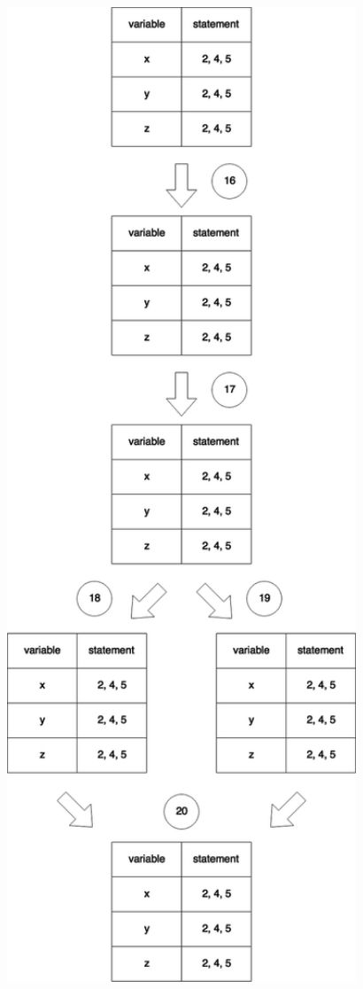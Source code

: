 \documentclass[12pt]{article}
\begin{document}
{{{{{{{{{{{{{{\begin{center}
\noindent
\begin{minipage}{15em}
\begin{flushleft}
\noindent
\includegraphics[width=1.15\textwidth]{affects4.png}

\end{flushleft}
\end{minipage}
\end{center}}}}}}}}}}}}}}}
\end{document}
